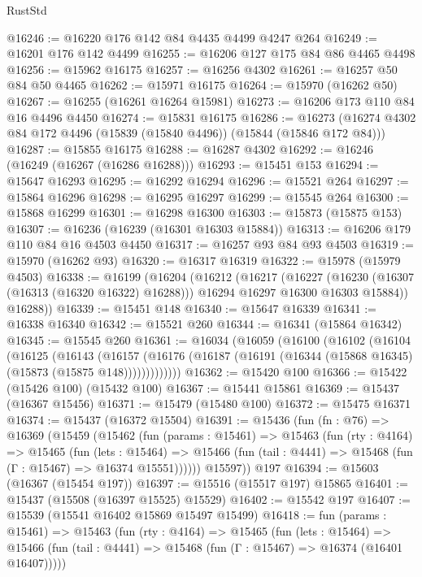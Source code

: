 \begin{lexlean}{RustStd}
\begin{coremodule}
@16246 := @16220 @176 @142 @84 @4435 @4499 @4247 @264
@16249 := @16201 @176 @142 @4499
@16255 := @16206 @127 @175 @84 @86 @4465 @4498
@16256 := @15962 @16175
@16257 := @16256 @4302
@16261 := @16257 @50 @84 @50 @4465
@16262 := @15971 @16175
@16264 := @15970 (@16262 @50)
@16267 := @16255 (@16261 @16264 @15981)
@16273 := @16206 @173 @110 @84 @16 @4496 @4450
@16274 := @15831 @16175
@16286 := @16273 (@16274 @4302 @84 @172 @4496 (@15839 (@15840 @4496)) (@15844 (@15846 @172 @84)))
@16287 := @15855 @16175
@16288 := @16287 @4302
@16292 := @16246 (@16249 (@16267 (@16286 @16288)))
@16293 := @15451 @153
@16294 := @15647 @16293
@16295 := @16292 @16294
@16296 := @15521 @264
@16297 := @15864 @16296
@16298 := @16295 @16297
@16299 := @15545 @264
@16300 := @15868 @16299
@16301 := @16298 @16300
@16303 := @15873 (@15875 @153)
@16307 := @16236 (@16239 (@16301 @16303 @15884))
@16313 := @16206 @179 @110 @84 @16 @4503 @4450
@16317 := @16257 @93 @84 @93 @4503
@16319 := @15970 (@16262 @93)
@16320 := @16317 @16319
@16322 := @15978 (@15979 @4503)
@16338 := @16199
    (@16204
      (@16212
        (@16217
          (@16227
            (@16230 (@16307 (@16313 (@16320 @16322) @16288)))
            @16294
            @16297
            @16300
            @16303
            @15884))
        @16288))
@16339 := @15451 @148
@16340 := @15647 @16339
@16341 := @16338 @16340
@16342 := @15521 @260
@16344 := @16341 (@15864 @16342)
@16345 := @15545 @260
@16361 := @16034
    (@16059
      (@16100
        (@16102
          (@16104
            (@16125
              (@16143
                (@16157
                  (@16176 (@16187 (@16191 (@16344 (@15868 @16345) (@15873 (@15875 @148)))))))))))))
@16362 := @15420 @100
@16366 := @15422 (@15426 @100) (@15432 @100)
@16367 := @15441 @15861
@16369 := @15437 (@16367 @15456)
@16371 := @15479 (@15480 @100)
@16372 := @15475 @16371
@16374 := @15437 (@16372 @15504)
@16391 := @15436
    (fun (fn : @76) =>
    @16369
      (@15459
        (@15462
          (fun (params : @15461) =>
          @15463
            (fun (rty : @4164) =>
            @15465
              (fun (lets : @15464) =>
              @15466 (fun (tail : @4441) => @15468 (fun (Γ : @15467) => @16374 @15551))))))
        @15597))
    @197
@16394 := @15603 (@16367 (@15454 @197))
@16397 := @15516 (@15517 @197) @15865
@16401 := @15437 (@15508 (@16397 @15525) @15529)
@16402 := @15542 @197
@16407 := @15539 (@15541 @16402 @15869 @15497 @15499)
@16418 := fun (params : @15461) =>
  @15463
    (fun (rty : @4164) =>
    @15465
      (fun (lets : @15464) =>
      @15466 (fun (tail : @4441) => @15468 (fun (Γ : @15467) => @16374 (@16401 @16407)))))

\end{coremodule}
\end{lexlean}
